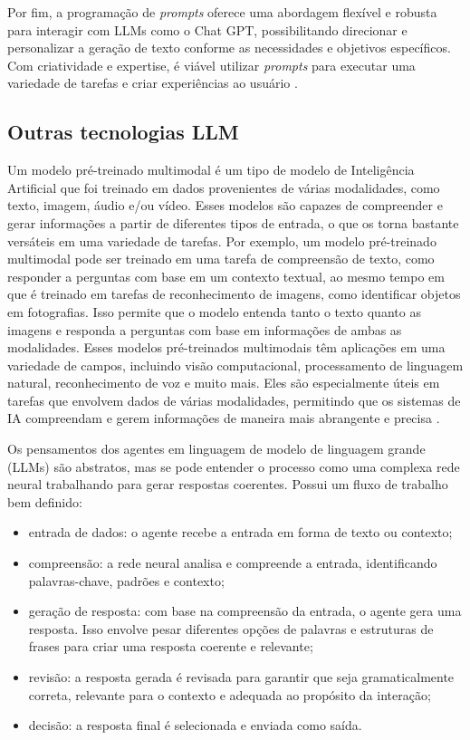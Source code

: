 \documentclass[10pt, conference, compsocconf]{IEEEtran}
\begin{document}
Por fim, a programação de \textit{prompts} oferece uma abordagem flexível e robusta para interagir com LLMs como o Chat GPT, possibilitando direcionar e personalizar a geração de texto conforme as necessidades e objetivos específicos. Com criatividade e expertise, é viável utilizar \textit{prompts} para executar uma variedade de tarefas e criar experiências ao usuário \cite{raffel2020exploring}.

\subsection{Outras tecnologias LLM}

Um modelo pré-treinado multimodal é um tipo de modelo de Inteligência Artificial que foi treinado em dados provenientes de várias modalidades, como texto, imagem, áudio e/ou vídeo. Esses modelos são capazes de compreender e gerar informações a partir de diferentes tipos de entrada, o que os torna bastante versáteis em uma variedade de tarefas. Por exemplo, um modelo pré-treinado multimodal pode ser treinado em uma tarefa de compreensão de texto, como responder a perguntas com base em um contexto textual, ao mesmo tempo em que é treinado em tarefas de reconhecimento de imagens, como identificar objetos em fotografias. Isso permite que o modelo entenda tanto o texto quanto as imagens e responda a perguntas com base em informações de ambas as modalidades. Esses modelos pré-treinados multimodais têm aplicações em uma variedade de campos, incluindo visão computacional, processamento de linguagem natural, reconhecimento de voz e muito mais. Eles são especialmente úteis em tarefas que envolvem dados de várias modalidades, permitindo que os sistemas de IA compreendam e gerem informações de maneira mais abrangente e precisa \cite{radford2021learning}.

Os pensamentos dos agentes em linguagem de modelo de linguagem grande (LLMs) são abstratos, mas se pode entender o processo como uma complexa rede neural trabalhando para gerar respostas coerentes. Possui um fluxo de trabalho bem definido:

\begin{itemize}
    \item entrada de dados: o agente recebe a entrada em forma de texto ou contexto;
    \item compreensão: a rede neural analisa e compreende a entrada, identificando palavras-chave, padrões e contexto;
    \item geração de resposta: com base na compreensão da entrada, o agente gera uma resposta. Isso envolve pesar diferentes opções de palavras e estruturas de frases para criar uma resposta coerente e relevante;
    \item revisão: a resposta gerada é revisada para garantir que seja gramaticalmente correta, relevante para o contexto e adequada ao propósito da interação;
    \item decisão: a resposta final é selecionada e enviada como saída.
\end{itemize}
\end{document}
